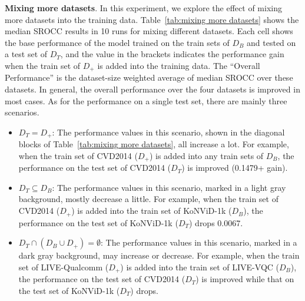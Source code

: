 \documentclass[twocolumn]{svjour3}          \smartqed  \usepackage{graphicx}
\begin{document}
\textbf{Mixing more datasets}.
In this experiment, we explore the effect of mixing more datasets into the training data.
Table~\ref{tab:mixing more datasets} shows the median SROCC results in 10 runs for mixing different datasets.
Each cell shows the base performance of the model trained on the train sets of $D_B$ and tested on a test set of $D_T$, and the value in the brackets indicates the performance gain when the train set of $D_{+}$ is added into the training data.
The ``Overall Performance'' is the dataset-size weighted average of median SROCC over these datasets.
In general, the overall performance over the four datasets is improved in most cases. 
As for the performance on a single test set, there are mainly three scenarios.
\begin{itemize}
\item $D_T = D_{+}$:
The performance values in this scenario, shown in the diagonal blocks of Table~\ref{tab:mixing more datasets}, all increase a lot. 
For example, when the train set of CVD2014 ($D_{+}$) is added into any train sets of $D_B$, the performance on the test set of CVD2014 ($D_{T}$) is improved (0.1479+ gain). 
\item $D_T\subseteq D_B$: 
The performance values in this scenario, marked in a light gray background, mostly decrease a little. 
For example, when the train set of CVD2014 ($D_{+}$) is added into the train set of KoNViD-1k ($D_B$), the performance on the test set of KoNViD-1k ($D_T$) drops 0.0067.
\item $D_T\cap (D_B\cup D_{+})=\emptyset$:
The performance values in this scenario, marked in a dark gray background, may increase or decrease.
For example, when the train set of LIVE-Qualcomm ($D_{+}$) is added into the train set of LIVE-VQC ($D_B$), the performance on the test set of CVD2014 ($D_T$) is improved while that on the test set of KoNViD-1k ($D_T$) drops.
\end{itemize}
\end{document}
